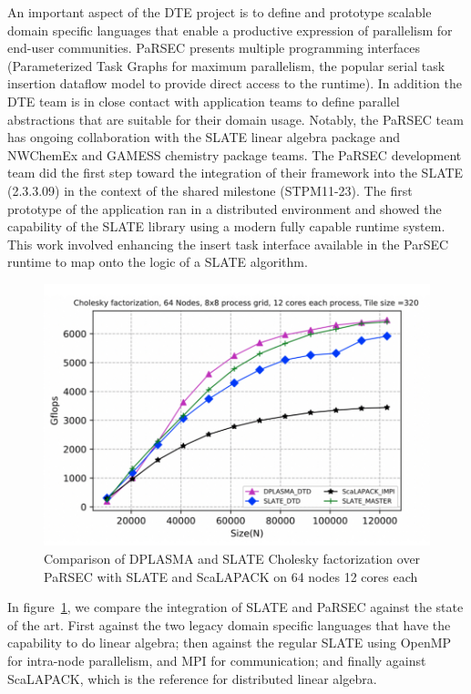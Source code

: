 An important aspect of the DTE project is to define and prototype scalable
domain specific languages that enable a productive expression of parallelism for
end-user communities. PaRSEC presents multiple programming interfaces
(Parameterized Task Graphs for maximum parallelism, the popular serial task
insertion dataflow model to provide direct access to the runtime). In addition
the DTE team is in close contact with application teams to define parallel
abstractions that are suitable for their domain usage. Notably, the PaRSEC team
has ongoing collaboration with the SLATE linear algebra package and NWChemEx and
GAMESS chemistry package teams. The PaRSEC development team did the first step
toward the integration of their framework into the SLATE (2.3.3.09) in the
context of the shared milestone (STPM11-23). The first prototype of the
application ran in a distributed environment and showed the capability of the
SLATE library using a modern fully capable runtime system. This work involved
enhancing the insert task interface available in the ParSEC runtime to map onto
the logic of a SLATE algorithm.

\begin{figure}
\vspace*{-1em}\centering\includegraphics[scale=0.50]{projects/2.3.1-PMR/2.3.1.09-ParSEC/slate_updated_nacl.pdf}
  \caption{Comparison of DPLASMA and SLATE Cholesky factorization over PaRSEC with
           SLATE and ScaLAPACK on 64 nodes 12 cores each\label{fig:slate-parsec}}
\end{figure}
%
In figure~\ref{fig:slate-parsec}, we compare the integration of SLATE
and PaRSEC against the state of the art. First against the two legacy
domain specific languages that have the capability to do linear
algebra; then against the regular SLATE using OpenMP for intra-node
parallelism, and MPI for communication; and finally against ScaLAPACK,
which is the reference for distributed linear algebra.



